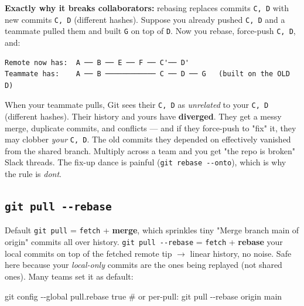 \documentclass[11pt]{article}
\newenvironment{Shaded}{\begin{snugshade}}{\end{snugshade}}
\newcommand{\AttributeTok}[1]{\textcolor[rgb]{0.16,0.50,0.73}{#1}}
\newcommand{\CommentTok}[1]{\textcolor[rgb]{0.48,0.49,0.49}{#1}}
\newcommand{\FunctionTok}[1]{\textcolor[rgb]{0.56,0.27,0.68}{#1}}
\newcommand{\NormalTok}[1]{\textcolor[rgb]{0.81,0.81,0.76}{#1}}
\begin{document}
\textbf{Exactly why it breaks collaborators:} rebasing replaces commits \texttt{C,\ D} with new commits \texttt{C\textquotesingle{},\ D\textquotesingle{}} (different hashes). Suppose you already pushed \texttt{C,\ D} and a teammate pulled them and built \texttt{G} on top of \texttt{D}. Now you rebase, force-push \texttt{C\textquotesingle{},\ D\textquotesingle{}}, and:

\setcodelang{}

\begin{verbatim}
Remote now has:  A ── B ── E ── F ── C'── D'
Teammate has:    A ── B ──────────── C ── D ── G   (built on the OLD D)
\end{verbatim}

When your teammate pulls, Git sees their \texttt{C,\ D} as \emph{unrelated} to your \texttt{C\textquotesingle{},\ D\textquotesingle{}} (different hashes). Their history and yours have \textbf{diverged}. They get a messy merge, duplicate commits, and conflicts --- and if they force-push to "fix" it, they may clobber \emph{your} \texttt{C\textquotesingle{},\ D\textquotesingle{}}. The old commits they depended on effectively vanished from the shared branch. Multiply across a team and you get "the repo is broken" Slack threads. The fix-up dance is painful (\texttt{git\ rebase\ -\/-onto}), which is why the rule is \emph{don\textquotesingle t}.

\subsection{\texorpdfstring{\texttt{git\ pull\ -\/-rebase}}{git pull -\/-rebase}}\label{git-pull---rebase}

Default \texttt{git\ pull} = \texttt{fetch} + \textbf{merge}, which sprinkles tiny "Merge branch \textquotesingle main\textquotesingle{} of origin" commits all over history. \texttt{git\ pull\ -\/-rebase} = \texttt{fetch} + \textbf{rebase} your local commits on top of the fetched remote tip \(\rightarrow\) linear history, no noise. Safe here because your \emph{local-only} commits are the ones being replayed (not shared ones). Many teams set it as default:


\begin{Shaded}
\begin{Highlighting}[]
\FunctionTok{git}\NormalTok{ config }\AttributeTok{{-}{-}global}\NormalTok{ pull.rebase true}
\CommentTok{\# or per{-}pull:}
\FunctionTok{git}\NormalTok{ pull }\AttributeTok{{-}{-}rebase}\NormalTok{ origin main}
\end{Highlighting}
\end{Shaded}
\end{document}
